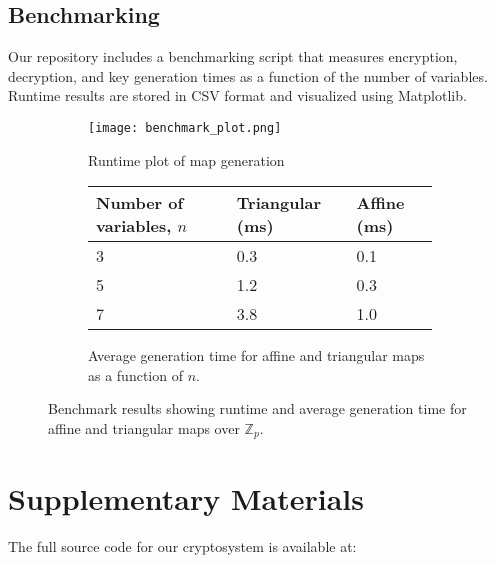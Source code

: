 \documentclass[12pt]{article}
\begin{document}
\subsection*{Benchmarking}

Our repository includes a benchmarking script that measures encryption, decryption, and key generation times as a function of the number of variables. Runtime results are stored in CSV format and visualized using Matplotlib.

\begin{figure}[H]
    \centering
    \begin{subfigure}{0.85\textwidth}
        \centering
        \texttt{[image: benchmark\_plot.png]}
        \caption{Runtime plot of map generation}
    \end{subfigure}

    \vspace{1em}

    \begin{subfigure}{0.85\textwidth}
        \centering
        \renewcommand{\arraystretch}{1.3}
        \begin{tabularx}{\textwidth}{|X|X|X|}
            \hline
            \textbf{Number of variables, $n$} & \textbf{Triangular (ms)} & \textbf{Affine (ms)} \\
            \hline
            3 & 0.3 & 0.1 \\
            5 & 1.2 & 0.3 \\
            7 & 3.8 & 1.0 \\
            \hline
        \end{tabularx}
        \caption{Average generation time for affine and triangular maps as a function of \( n \).}
    \end{subfigure}

    \caption{Benchmark results showing runtime and average generation time for affine and triangular maps over \( \mathbb{Z}_p \).}
    \label{fig:benchmark-plot}
\end{figure}
\footnotemark
{}

\section*{Supplementary Materials}

The full source code for our cryptosystem is available at:
\end{document}
